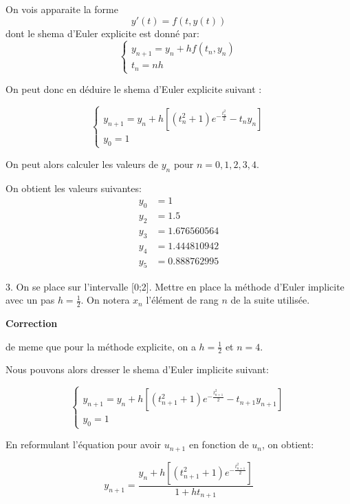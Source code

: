 \documentclass{article}
\newcommand{\correction}[0]{
    \vspace{1mm}
    \textbf{Correction}
    \hrulefill
}
\begin{document}
On vois apparaite la forme $$y'(t) = f(t,y(t))$$
dont le shema d'Euler explicite est donné par:
$$
\begin{cases}
    y_{n+1} = y_n + h f(t_n,y_n) \\
    t_n = nh
\end{cases}
$$


On peut donc en déduire le shema d'Euler explicite suivant :

\begin{equation*}
    \begin{cases}
        y_{n+1} = y_n + h \left[ \left(t_n^2 + 1\right)e^{-\frac{t_n^2}{2}} - t_n y_n \right] \\
        y_{0} = 1
    \end{cases}
\end{equation*}

On peut alors calculer les valeurs de $y_n$ pour $n = 0, 1, 2, 3, 4$.

On obtient les valeurs suivantes:
\begin{align*}
    y_0 &= 1 \\
    y_2 &= 1.5 \\
    y_3 &= 1.676560564 \\
    y_4 &= 1.444810942 \\
    y_5 &= 0.888762995
\end{align*}




\hrulefill

3. On se place sur l'intervalle [0;2]. Mettre en place la méthode d'Euler implicite avec
un pas $h=\frac12.$ On notera $x_n$ l'élément de rang $n$ de la suite utilisée.

\correction

de meme que pour la méthode explicite, on a $h = \frac{1}{2}$ et $n = 4$.

Nous pouvons alors dresser le shema d'Euler implicite suivant:

\begin{equation*}
    \begin{cases}
        y_{n+1} = y_n + h \left[ \left(t_{n+1}^2 + 1\right)e^{-\frac{t_{n+1}^2}{2}} - t_{n+1} y_{n+1} \right] \\
        y_{0} = 1
    \end{cases}
\end{equation*}

En reformulant l'équation pour avoir $u_{n+1}$ en fonction de $u_n$, on obtient:

\begin{equation*}
    y_{n+1} = \dfrac{y_n + h \left[ \left(t_{n+1}^2 + 1\right)e^{-\frac{t_{n+1}^2}{2}} \right]}{1 + h t_{n+1}}
\end{equation*}
\end{document}

